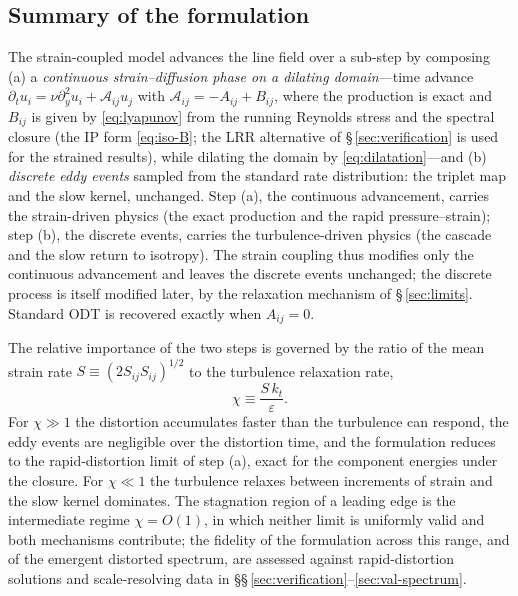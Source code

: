 \documentclass[lineno]{JFM-FLM_Au}
\begin{document}
\subsection{Summary of the formulation}\label{sec:summary}

The strain-coupled model advances the line field over a sub-step by
composing (a) a \emph{continuous strain--diffusion phase on a dilating
domain}---time advance
$\partial_t u_i=\nu\partial_y^2u_i+\mathcal{A}_{ij}u_j$ with
$\mathcal{A}_{ij}=-A_{ij}+B_{ij}$, where the production is exact and $B_{ij}$ is
given by \eqref{eq:lyapunov} from the running Reynolds stress and the
spectral closure (the IP form \eqref{eq:iso-B}; the LRR alternative of
\S\,\ref{sec:verification} is used for the strained results), while dilating the domain
by \eqref{eq:dilatation}---and (b) \emph{discrete eddy events} sampled
from the standard rate distribution: the triplet map and the slow kernel,
unchanged. Step (a), the continuous advancement, carries the strain-driven physics
(the exact production and the rapid pressure--strain); step (b), the
discrete events, carries the turbulence-driven physics (the cascade and
the slow return to isotropy). The strain coupling thus modifies only the
continuous advancement and leaves the discrete events unchanged; the
discrete process is itself modified later, by the relaxation mechanism
of \S\,\ref{sec:limits}. Standard ODT is recovered exactly when
$A_{ij}=0$.

The relative importance of the two steps is governed by the ratio of the
mean strain rate $S\equiv(2S_{ij}S_{ij})^{1/2}$ to the turbulence
relaxation rate,
\begin{equation}
  \chi \equiv \frac{S\,k_t}{\varepsilon}.
  \label{eq:chi}
\end{equation}
For $\chi\gg1$ the distortion accumulates faster than the turbulence can
respond, the eddy events are negligible over the distortion time, and the
formulation reduces to the rapid-distortion limit of step (a), exact for
the component energies under the closure. For $\chi\ll1$ the turbulence
relaxes between increments of strain and the slow kernel dominates. The
stagnation region of a leading edge is the intermediate regime
$\chi=O(1)$, in which neither limit is uniformly valid and both
mechanisms contribute; the fidelity of the formulation across this range,
and of the emergent distorted spectrum, are assessed against
rapid-distortion solutions and scale-resolving data in
\S\S\,\ref{sec:verification}--\ref{sec:val-spectrum}.

\end{document}

